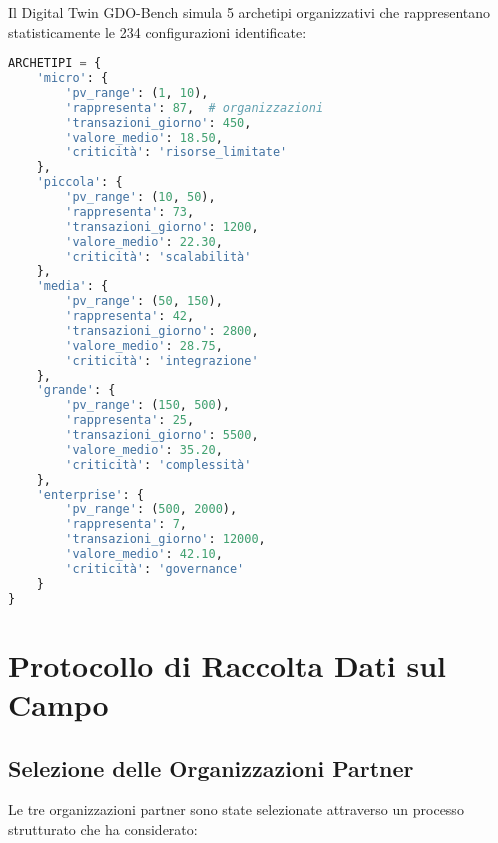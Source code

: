 Il Digital Twin GDO-Bench simula 5 archetipi organizzativi che 
rappresentano statisticamente le 234 configurazioni identificate:

\begin{lstlisting}[language=Python]
ARCHETIPI = {
    'micro': {
        'pv_range': (1, 10),
        'rappresenta': 87,  # organizzazioni
        'transazioni_giorno': 450,
        'valore_medio': 18.50,
        'criticità': 'risorse_limitate'
    },
    'piccola': {
        'pv_range': (10, 50),
        'rappresenta': 73,
        'transazioni_giorno': 1200,
        'valore_medio': 22.30,
        'criticità': 'scalabilità'
    },
    'media': {
        'pv_range': (50, 150),
        'rappresenta': 42,
        'transazioni_giorno': 2800,
        'valore_medio': 28.75,
        'criticità': 'integrazione'
    },
    'grande': {
        'pv_range': (150, 500),
        'rappresenta': 25,
        'transazioni_giorno': 5500,
        'valore_medio': 35.20,
        'criticità': 'complessità'
    },
    'enterprise': {
        'pv_range': (500, 2000),
        'rappresenta': 7,
        'transazioni_giorno': 12000,
        'valore_medio': 42.10,
        'criticità': 'governance'
    }
}
\end{lstlisting}

\section{\texorpdfstring{Protocollo di Raccolta Dati sul Campo}{A.2 - Protocollo di Raccolta Dati sul Campo}}

\subsection{\texorpdfstring{Selezione delle Organizzazioni Partner}{A.2.1 - Selezione delle Organizzazioni Partner}}

Le tre organizzazioni partner sono state selezionate attraverso un processo strutturato che ha considerato:

